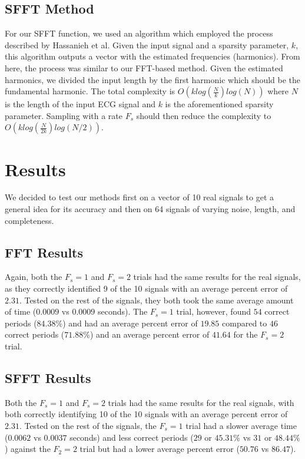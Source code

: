\documentclass[twocolumn]{article}
\begin{document}
\begin{flushleft}
		\hspace{2em}\subsection{SFFT Method}
		For our SFFT function, we used an algorithm which employed the process described by Hassanieh et al\cite{paperSFFT}. Given the input signal and a sparsity parameter, $k$, this algorithm outputs a vector with the estimated frequencies (harmonics). From here, the process was similar to our FFT-based method. Given the estimated harmonics, we divided the input length by the first harmonic which should be the fundamental harmonic. The total complexity is $O(klog(\frac{N}{k})log(N))$ where $N$ is the length of the input ECG signal and $k$ is the aforementioned sparsity parameter. Sampling with a rate $F_{s}$ should then reduce the complexity to $O(klog(\frac{N}{2k})log(N/2))$.  \\ \vspace{-1em}
		
		\section{Results}
		We decided to test our methods first on a vector of 10 real signals to get a general idea for its accuracy and then on 64 signals of varying noise, length, and completeness. \\ \vspace{-2em}
		
		\hspace{2em}\subsection{FFT Results} \label{ssec:resultsFFT}
		Again, both the $F_{s}=1$ and $F_{s}=2$ trials had the same results for the real signals, as they correctly identified 9 of the 10 signals with an average percent error of $2.31$. Tested on the rest of the signals, they both took the same average amount of time ($0.0009$ vs $0.0009$ seconds). The $F_{s}=1$ trial, however, found $54$ correct periods ($84.38\%$) and had an average percent error of $19.85$ compared to $46$ correct periods ($71.88\%$) and an average percent error of $41.64$ for the $F_{s}=2$ trial. \\ \vspace{-2em}
		
		\hspace{2em}\subsection{SFFT Results}  \label{ssec:resultsSFFT}
		Both the $F_{s}=1$ and $F_{s}=2$ trials had the same results for the real signals, with both correctly identifying 10 of the 10 signals with an average percent error of $2.31$. Tested on the rest of the signals, the $F_{s}=1$ trial had a slower average time ($0.0062$ vs $0.0037$ seconds) and less correct periods ($29$  or $45.31\%$ vs $31$ or $48.44\%$) against the $F_{2}=2$ trial but had a lower average percent error ($50.76$ vs $86.47$). \\ \vspace{-1em}


\end{flushleft}
\end{document}
